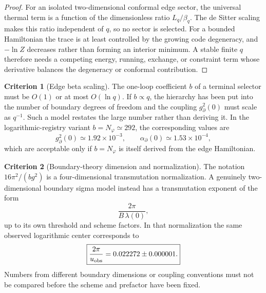 \documentclass[aps,prd,reprint,nofootinbib,superscriptaddress,floatfix]{revtex4-2}
\numberwithin{equation}{section}
\theoremstyle{definition}
\newtheorem{criterion}{Criterion}[section]
\theoremstyle{plain}
\begin{document}
\begin{proof}
For an isolated two-dimensional conformal edge sector, the universal thermal
term is a function of the dimensionless ratio \(L_q/\beta_q\).  The de Sitter
scaling makes this ratio independent of \(q\), so no sector is selected.  For a
bounded Hamiltonian the trace is at least controlled by the growing code
degeneracy, and \(-\ln Z\) decreases rather than forming an interior minimum.
A stable finite \(q\) therefore needs a competing energy, running, exchange, or
constraint term whose derivative balances the degeneracy or conformal
contribution.
\end{proof}

\begin{criterion}[Edge beta scaling]\label{crit:beta-scaling}
The one-loop coefficient \(b\) of a terminal selector must be \(O(1)\) or at
most \(O(\ln q)\).  If \(b\propto q\), the hierarchy has been put into the
number of boundary degrees of freedom and the coupling \(g_\partial^2(0)\)
must scale as \(q^{-1}\).  Such a model restates the large number rather than
deriving it.  In the logarithmic-registry variant \(b=N_\varphi\simeq292\),
the corresponding values are
\[
g_\partial^2(0)\simeq1.92\times10^{-3},
\qquad
\alpha_\partial(0)\simeq1.53\times10^{-4},
\]
which are acceptable only if \(b=N_\varphi\) is itself derived from the
edge Hamiltonian.
\end{criterion}

\begin{criterion}[Boundary-theory dimension and normalization]\label{crit:dimension-normalization}
The notation \(16\pi^2/(b g^2)\) is a four-dimensional transmutation
normalization.  A genuinely two-dimensional boundary sigma model instead has
a transmutation exponent of the form
\[
        \frac{2\pi}{B\,\lambda(0)} ,
\]
up to its own threshold and scheme factors.  In that normalization the same
observed logarithmic center corresponds to
\begin{equation}
\boxed{
        \frac{2\pi}{u_{\rm obs}}
        =
        0.022272\pm0.000001 .
}
\end{equation}
Numbers from different boundary dimensions or coupling conventions must not
be compared before the scheme and prefactor have been fixed.
\end{criterion}
\end{document}
